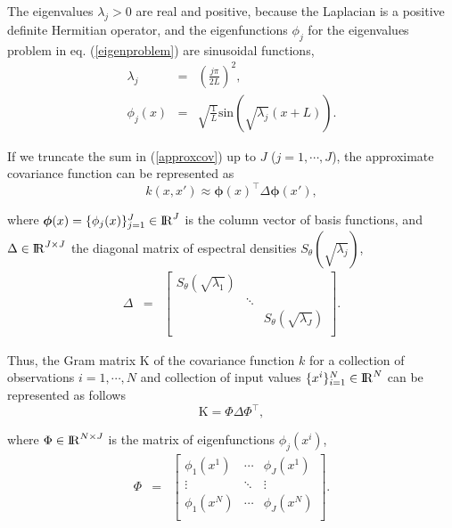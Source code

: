 \documentclass[]{interact}
\theoremstyle{plain}%
\theoremstyle{definition}
\theoremstyle{remark}
\begin{document}
\noindent The eigenvalues $\lambda_j>0$ are real and positive, because the Laplacian is a positive definite Hermitian operator, and the eigenfunctions $\phi_j$ for the eigenvalues problem in eq. (\ref{eigenproblem}) are sinusoidal functions,
%
\begin{eqnarray}
\lambda_j&=&\left(\frac{j\pi}{2L}\right)^2, \\
\phi_j(x)&=&\sqrt{\frac{1}{L}} \text{sin}\left(\sqrt{\lambda_j}(x+L)\right).
\end{eqnarray}

If we truncate the sum in (\ref{approxcov}) up to $J$ ($j=1,\cdots,J$), the approximate covariance function can be represented as
%
\begin{equation}
k(x,x') \approx \boldsymbol{\phi}(x)^\intercal \Delta \boldsymbol{\phi}(x'), \nonumber
\end{equation}

\noindent where $\boldsymbol{\phi}(x)=\{\phi_j(x)\}_{j=1}^{J} \in {\rm I\!R}^{J}$ is the column vector of basis functions, and $\Delta  \in {\rm I\!R}^{J\times J}$ the diagonal matrix of espectral densities $S_{\theta}(\sqrt{\lambda_j})$, 
%
\begin{eqnarray}
\Delta &=&  \begin{bmatrix}
    S_{\theta}(\sqrt{\lambda_1}) & & \\
    & \ddots & \nonumber \\
    & & S_{\theta}(\sqrt{\lambda_J}) \\
  \end{bmatrix}.
\end{eqnarray}

Thus, the Gram matrix $\text{K}$ of the covariance function $k$ for a collection of observations $i=1,\cdots,N$ and collection of input values $\{x^i\}_{i=1}^{N} \in {\rm I\!R}^{N}$ can be represented as follows
%
\begin{equation}
\text{K}= \Phi \Delta \Phi^\intercal, \nonumber
\end{equation}

\noindent where $\Phi \in {\rm I\!R}^{N\times J}$ is the matrix of eigenfunctions $\phi_j(x^i)$,
%
\begin{eqnarray}
\Phi &=&  \left[ {\begin{array}{ccc}
   \phi_1(x^1) & \cdots & \phi_J(x^1)  \\
    \vdots &\ddots & \vdots  \nonumber \\ 
    \phi_1(x^N) & \cdots & \phi_J(x^N) \\
  \end{array} } \right].
\end{eqnarray}
 
\end{document}
